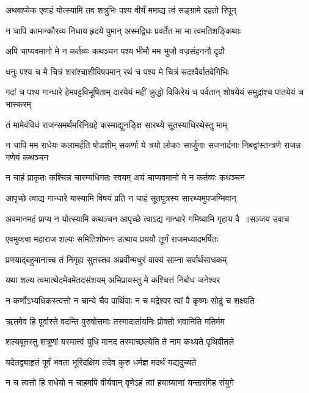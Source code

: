 \twolineshloka
{अथवाप्येक एवाहं योत्स्यामि तव शत्रुभिः}
{पश्य वीर्यं ममाद्य त्वं सङ्ग्रामे दहतो रिपून्}


\twolineshloka
{न चापि कामान्कौरव्य निधाय हृदये पुमान्}
{अस्मद्विधः प्रवर्तेत मा मा त्वमतिशङ्किथाः}


\twolineshloka
{अपि चाप्यवमानो मे न कर्तव्यः कथञ्चन}
{पश्य भीमौ मम भुजौ वज्रसंहननौ दृढौ}


\twolineshloka
{धनुः पश्य च मे चित्रं शरांश्चाशीविषपमान्}
{रथं च पश्य मे चित्रं सदश्वैर्वातवेगिभिः}


\threelineshloka
{गदां च पश्य गान्धारे हेमपट्टविभूषिताम्}
{दारयेयं महीं क्रुद्धो विकिरेयं च पर्वतान्}
{शोषयेयं समुद्रांश्च पातयेयं च भास्करम्}


\twolineshloka
{तं मामेवंविधं राजन्समर्थमरिनिग्रहे}
{कस्माद्युनङ्क्षि सारथ्ये सूतस्याधिरथेस्तु माम्}


न चापि मम राधेयः कलामर्हति षोडशीम्
\twolineshloka
{सकर्णा ये त्रयो लोकाः सार्जुनाः सजनार्दनाः}
{निबद्वांस्तन्त्रणे राजन्न गणेयं कथञ्चन}


\twolineshloka
{न चाहं प्राकृतः कश्चिन्न चास्म्यधिगतः स्वयम्}
{अयं चाप्यवमानो मे न कर्तव्यः कथञ्चन}


\twolineshloka
{आपृच्छे त्वाद्य गान्धारे यास्यामि विषयं प्रति}
{न चाहं सूतपुत्रस्य सारथ्यमुपजग्मिवान्}


\threelineshloka
{अवमानमहं प्राप्य न योत्स्यामि कथञ्चन}
{आपृच्छे त्वाऽद्य गान्धारे गमिष्यामि गृहाय वै ॥सञ्जय उवाच}
{}


\twolineshloka
{एवमुक्त्वा महाराज शल्यः समितिशोभनः}
{उत्थाय प्रययौ तूर्णं राजमध्यादमर्षितः}


\twolineshloka
{प्रणयाद्बहुमानाच्च तं निगृह्य सुतस्तव}
{अब्रवीन्मधुरं वाक्यं साम्ना सर्वार्थसाधकम्}


\twolineshloka
{यथा शल्य त्वमात्थेदमेवमेतदसंशयम्}
{अभिप्रायस्तु मे कश्चित्तं निबोध जनेश्वर}


\twolineshloka
{न कर्णोऽभ्यधिकस्त्वत्तो न चान्ये चैव पार्थिवाः}
{न च मद्रेश्वर त्वां वै कृष्णः सोढुं च शक्ष्यति}


\twolineshloka
{ऋतमेव हि पूर्वास्ते वदन्ति पुरुषोत्तमाः}
{तस्मादार्तायनिः प्रोक्तो भवानिति मतिर्मम}


\twolineshloka
{शल्यबूतस्तु शत्रूणां यस्मात्त्वं युधि मानद}
{तस्माच्छल्येति ते नाम कथ्यते पृथिवीतले}


\twolineshloka
{यदेतद्व्याहृतं पूर्वं भवता भूरिदक्षिण}
{तदेव कुरु धर्मज्ञ मदर्थं यद्यदुच्यते}


\twolineshloka
{न च त्वत्तो हि राधेयो न चाहमपि वीर्यवान्}
{वृणेऽहं त्वां हयाग्र्याणां यन्तारमिह संयुगे}


